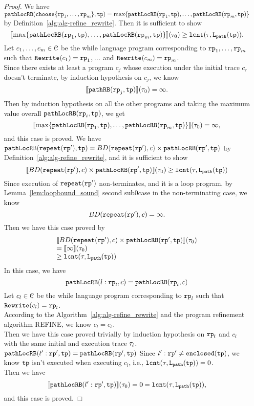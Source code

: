 \begin{proof}
We have $\outinB(\rpchoose{\rprog_1, \ldots, \rprog_m }, \tpath) = \max\left\{ \outinB(\rprog_1, \tpath), \ldots, \outinB(\rprog_m, \tpath) \right\}$ by Definition~\ref{alg:alg-refine_rewrite}.
Then it is sufficient to show
\[
  \econfig{\max\left\{ \outinB(\rprog_1, \tpath), \ldots, \outinB(\rprog_m, \tpath) \right\}}(\trace_0) \geq \lcounter(\trace, \pathl(\tpath)).
\]
Let $c_1, \ldots, c_m \in \mathcal{C}$ be the while language program corresponding to $\mathtt{rp}_1, \ldots, \mathtt{rp}_m$ such that $\mathtt{Rewrite}(c_1) = \mathtt{rp}_1$, $\ldots$ and  $\mathtt{Rewrite}(c_m) = \mathtt{rp}_m$.
\\
Since there exists at least a program $c_j$ whose execution under the initial trace $c_r$ doesn't terminate, by induction hypothesis on $c_j$, we know 
\[
  \llbracket \mathtt{pathRB}(\mathtt{rp}_j, \mathtt{tp}) \rrbracket(\mathtt{\tau}_0) = \infty.
\]
Then by induction hypothesis on all the other programs and taking the maximum value overall $\mathtt{pathLocRB}(\mathtt{rp}_i, \mathtt{tp})$, we get
\[
  \econfig{\max\left\{ \outinB(\rprog_1, \tpath), \ldots, \outinB(\rprog_m, \tpath) \right\}}(\trace_0) = \infty,
\]
and this case is proved.
We have $\mathtt{pathLocRB}(\mathtt{repeat}(\mathtt{rp}'), \mathtt{tp}) = BD(\mathtt{repeat}(\mathtt{rp}'), c) \times \mathtt{pathLocRB}(\mathtt{rp}', \mathtt{tp})$
by Definition~\ref{alg:alg-refine_rewrite}, and
it is sufficient to show
\[
  \llbracket  BD(\mathtt{repeat}(\mathtt{rp}'), c) \times \mathtt{pathLocRB}(\mathtt{rp}', \mathtt{tp}) \rrbracket (\mathtt{\tau}_0) \geq \mathtt{lcnt}(\mathtt{\tau}, \mathtt{L}_{\mathtt{path}}(\mathtt{tp})) 
\]
Since execution of $\mathtt{repeat}(\mathtt{rp}')$ non-terminates, and it is a loop program,
by Lemma~\ref{lem:loopbound_sound} second sub0case in the non-terminating case, we know
\[
  BD(\mathtt{repeat}(\mathtt{rp}'), c) = \infty.
\]
Then we have this case proved by
\[
  \begin{array}{l}
  \llbracket BD(\mathtt{repeat}(\mathtt{rp}'), c) \times \mathtt{pathLocRB}(\mathtt{rp}', \mathtt{tp}) \rrbracket(\mathtt{\tau}_0) 
  \\
  =
  \llbracket  \infty  \rrbracket(\mathtt{\tau}_0) 
  \\
  \geq \mathtt{lcnt}(\mathtt{\tau}, \mathtt{L}_{\mathtt{path}}(\mathtt{tp})) 
  \end{array}
  \]
  In this case, we have
  \[
    \mathtt{pathLocRB}(l: \mathtt{rp}_l, c) = \mathtt{pathLocRB}(\mathtt{rp}_l, c)
  \]
  Let $c_l \in \mathcal{C}$ be the while language program corresponding to $\mathtt{rp}_l$ such that $\mathtt{Rewrite}(c_l) = \mathtt{rp}_l$.
  \\
  According to the Algorithm~\ref{alg:alg-refine_rewrite} and the program refinement algorithm REFINE, we know
  $c_l = c_l$.
  \\
  Then we have this case proved trivially by induction hypothesis on $\mathtt{rp}_l$ and $c_l$ with the same initial and execution trace $\mathtt{\tau}_l$.
$\mathtt{pathLocRB}(l': \mathtt{rp}', \mathtt{tp}) = \mathtt{pathLocRB}(\mathtt{rp}', \mathtt{tp})$ 
Since $l': \mathtt{rp}' \neq \mathtt{enclosed}(\mathtt{tp})$, we know $\mathtt{tp}$ isn't executed when executing $c_l$, i.e., $\mathtt{lcnt}(\mathtt{\tau}, \mathtt{L}_{\mathtt{path}}(\mathtt{tp})) = 0$.
\\
Then we have
\[
  \llbracket \mathtt{pathLocRB}(l': \mathtt{rp}', \mathtt{tp}) \rrbracket(\mathtt{\tau}_0) = 0 = \mathtt{lcnt}(\mathtt{\tau}, \mathtt{L}_{\mathtt{path}}(\mathtt{tp})),
  \]
and this case is proved.
\end{proof}


